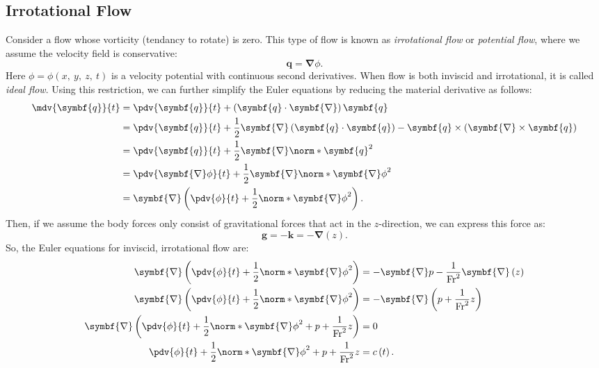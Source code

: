 \documentclass{article}
\theoremstyle{definition}
\begin{document}
\subsection{Irrotational Flow}
Consider a flow whose vorticity (tendancy to rotate) is zero. This type
of flow is known as \textit{irrotational flow} or \textit{potential
flow}, where we assume the velocity field is conservative:
\begin{equation*}
    \symbf{q} = \symbf{\nabla} \phi.
\end{equation*}
Here \(\phi = \phi\left( x,\: y,\: z,\: t \right)\) is a velocity
potential with continuous second derivatives. When flow is both
inviscid and irrotational, it is called \textit{ideal flow}. Using this
restriction, we can further simplify the Euler equations by reducing the
material derivative as follows:
\begin{align*}
    \mdv{\symbf{q}}{t} & = \pdv{\symbf{q}}{t} + \left( \symbf{q} \cdot \symbf{\nabla} \right) \symbf{q}                                                                               \\
                       & = \pdv{\symbf{q}}{t} + \frac{1}{2} \symbf{\nabla} \left( \symbf{q} \cdot \symbf{q} \right) - \symbf{q} \times \left( \symbf{\nabla} \times \symbf{q} \right) \\
                       & = \pdv{\symbf{q}}{t} + \frac{1}{2} \symbf{\nabla} \norm*{\symbf{q}}^2                                                                                        \\
                       & = \pdv{\symbf{\nabla} \phi}{t} + \frac{1}{2} \symbf{\nabla} \norm*{\symbf{\nabla} \phi}^2                                                                    \\
                       & = \symbf{\nabla} \left( \pdv{\phi}{t} + \frac{1}{2} \norm*{\symbf{\nabla} \phi}^2 \right).
\end{align*}
Then, if we assume the body forces only consist of gravitational forces
that act in the \(z\)-direction, we can express this force as:
\begin{equation*}
    \symbf{g} = -\symbf{k} = -\symbf{\nabla} \left( z \right).
\end{equation*}
So, the Euler equations for inviscid, irrotational flow are:
\begin{align*}
    \symbf{\nabla} \left( \pdv{\phi}{t} + \frac{1}{2} \norm*{\symbf{\nabla} \phi}^2 \right)                                 & = -\symbf{\nabla} p - \frac{1}{\mathrm{Fr}^2} \symbf{\nabla} \left( z \right) \\
    \symbf{\nabla} \left( \pdv{\phi}{t} + \frac{1}{2} \norm*{\symbf{\nabla} \phi}^2 \right)                                 & = -\symbf{\nabla} \left( p + \frac{1}{\mathrm{Fr}^2} z \right)                \\
    \symbf{\nabla} \left( \pdv{\phi}{t} + \frac{1}{2} \norm*{\symbf{\nabla} \phi}^2 + p + \frac{1}{\mathrm{Fr}^2} z \right) & = 0                                                                           \\
    \pdv{\phi}{t} + \frac{1}{2} \norm*{\symbf{\nabla} \phi}^2 + p + \frac{1}{\mathrm{Fr}^2} z                               & = c\left( t \right).
\end{align*}
\end{document}
